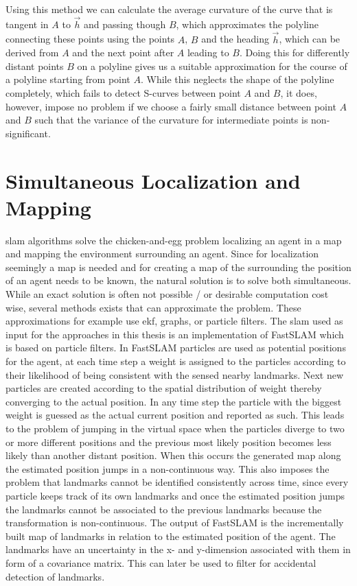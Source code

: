 
Using this method we can calculate the average curvature of the curve that is tangent in $A$ to $\vec h$ and passing though $B$, which approximates the polyline connecting these points using the points $A$, $B$ and the heading  $\vec h$, which can be derived from $A$ and the next point after $A$ leading to $B$.
Doing this for differently distant points $B$ on a polyline gives us a suitable approximation for the course of a polyline starting from point $A$. While this neglects the shape of the polyline completely, which fails to detect S-curves between point $A$ and $B$, it does, however, impose no problem if we choose a fairly small distance between point $A$ and $B$ such that the variance of the curvature for intermediate points is non-significant.


\section{Simultaneous Localization and Mapping}
\ac{slam} algorithms solve the chicken-and-egg problem localizing an agent in a map and mapping the environment surrounding an agent. Since for localization seemingly a map is needed and for creating a map of the surrounding the position of an agent needs to be known, the natural solution is to solve both simultaneous. While an exact solution is often not possible / or desirable computation cost wise, several methods exists that can approximate the problem. These approximations for example use \ac{ekf}, graphs, or particle filters. The \ac{slam} used as input for the approaches in this thesis is an implementation of FastSLAM \cite{FastSLAM2002} which is based on particle filters. In FastSLAM particles are used as potential positions for the agent, at each time step a weight is assigned to the particles according to their likelihood of being consistent with the sensed nearby landmarks. Next new particles are created according to the spatial distribution of weight thereby converging to the actual position. In any time step the particle with the biggest weight is guessed as the actual current position and reported as such. This leads to the problem of jumping in the virtual space when the particles diverge to two or more different positions and the previous most likely position becomes less likely than another distant position. When this occurs the generated map along the estimated position jumps in a non-continuous way. This also imposes the problem that landmarks cannot be identified consistently across time, since every particle keeps track of its own landmarks and once the estimated position jumps the landmarks cannot be associated to the previous landmarks because the transformation is non-continuous. The output of FastSLAM is the incrementally built map of landmarks in relation to the estimated position of the agent. The landmarks have an uncertainty in the x- and y-dimension associated with them in form of a covariance matrix. This can later be used to filter for accidental detection of landmarks.

